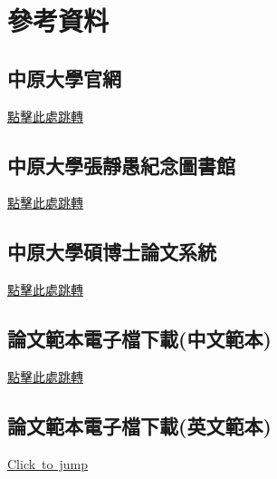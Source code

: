 
\section*{參考資料}
\subsection*{中原大學官網}
\href{https://www.cycu.edu.tw/}{點擊此處跳轉}\\
\subsection*{中原大學張靜愚紀念圖書館}
\href{https://www.lib.cycu.edu.tw/cycu/Index.action?lang=zh_TW}{點擊此處跳轉}\\
\subsection*{中原大學碩博士論文系統}
\href{https://cloud.ncl.edu.tw/cycu/}{點擊此處跳轉}\\
\subsection*{論文範本電子檔下載(中文範本)}
\href{https://www.lib.cycu.edu.tw/cycu/Fpage.action?muid=436&fid=406&lang=zh_TW&changeLang=true}{點擊此處跳轉}\\
\subsection*{論文範本電子檔下載(英文範本)}
\href{https://www.lib.cycu.edu.tw/cycu/Fpage.action?muid=440&fid=410&lang=en_US&changeLang=true}{Click\ to\ jump}\\
\clearpage